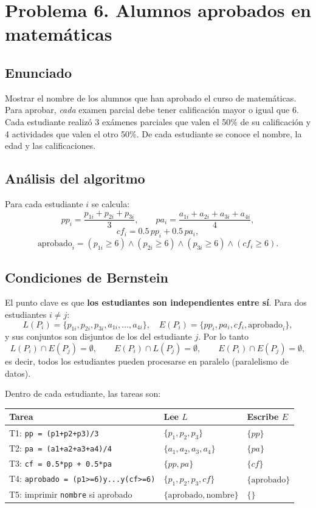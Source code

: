 \section{Problema 6. Alumnos aprobados en matem\'aticas}

\subsection*{Enunciado}
Mostrar el nombre de los alumnos que han aprobado el curso de matem\'aticas.
Para aprobar, \emph{cada} examen parcial debe tener calificaci\'on mayor o
igual que 6. Cada estudiante realiz\'o 3 ex\'amenes parciales que valen el 50\%
de su calificaci\'on y 4 actividades que valen el otro 50\%. De cada estudiante
se conoce el nombre, la edad y las calificaciones.

\subsection*{An\'alisis del algoritmo}
Para cada estudiante $i$ se calcula:
\[
    pp_i = \frac{p_{1i}+p_{2i}+p_{3i}}{3}, \qquad
    pa_i = \frac{a_{1i}+a_{2i}+a_{3i}+a_{4i}}{4},
\]
\[
    cf_i = 0.5\,pp_i + 0.5\,pa_i,
\]
\[
    \text{aprobado}_i =
    (p_{1i}\ge 6) \wedge (p_{2i}\ge 6) \wedge (p_{3i}\ge 6)
    \wedge (cf_i \ge 6).
\]

\subsection*{Condiciones de Bernstein}
El punto clave es que \textbf{los estudiantes son independientes entre s\'i}.
Para dos estudiantes $i \neq j$:
\[
    L(P_i) = \{p_{1i},p_{2i},p_{3i},a_{1i},\dots,a_{4i}\}, \quad
    E(P_i) = \{pp_i, pa_i, cf_i, \text{aprobado}_i\},
\]
y sus conjuntos son disjuntos de los del estudiante $j$. Por lo tanto
\[
    L(P_i)\cap E(P_j)=\emptyset,\qquad
    E(P_i)\cap L(P_j)=\emptyset,\qquad
    E(P_i)\cap E(P_j)=\emptyset,
\]
es decir, todos los estudiantes pueden procesarse en paralelo (paralelismo de
datos).

Dentro de cada estudiante, las tareas son:
\begin{center}
\begin{tabular}{lll}
\toprule
Tarea & Lee $L$ & Escribe $E$ \\
\midrule
T1: \texttt{pp = (p1+p2+p3)/3}              & $\{p_1,p_2,p_3\}$       & $\{pp\}$  \\
T2: \texttt{pa = (a1+a2+a3+a4)/4}           & $\{a_1,a_2,a_3,a_4\}$   & $\{pa\}$  \\
T3: \texttt{cf = 0.5*pp + 0.5*pa}           & $\{pp,pa\}$             & $\{cf\}$  \\
T4: \texttt{aprobado = (p1>=6)y...y(cf>=6)} & $\{p_1,p_2,p_3,cf\}$    & $\{\text{aprobado}\}$ \\
T5: imprimir \texttt{nombre} si aprobado    & $\{\text{aprobado},\text{nombre}\}$ & $\{\}$ \\
\bottomrule
\end{tabular}
\end{center}


